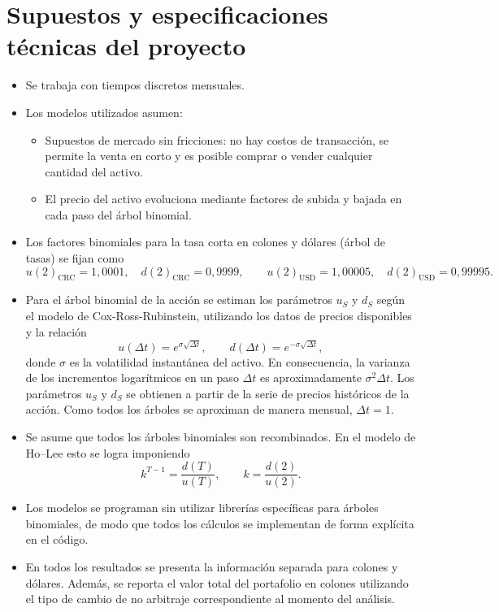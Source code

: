 \documentclass[12pt, a4paper]{article}
\begin{document}
\section{Supuestos y especificaciones técnicas del proyecto}

\begin{itemize}
    \item Se trabaja con tiempos discretos mensuales.
    \item Los modelos utilizados asumen:
    \begin{itemize}
      \item Supuestos de mercado sin fricciones: no hay costos de transacción, se permite la venta en corto y es posible comprar o vender cualquier cantidad del activo.
      \item El precio del activo evoluciona mediante factores de subida y bajada en cada paso del árbol binomial.
    \end{itemize}
  \item Los factores binomiales para la tasa corta en colones y dólares (árbol de tasas) se fijan como
  \[
    u{(2)}_{\text{CRC}} = 1{,}0001,
    \quad
    d{(2)}_{\text{CRC}} = 0{,}9999,
    \qquad
    u{(2)}_{\text{USD}} = 1{,}00005,
    \quad
    d{(2)}_{\text{USD}} = 0{,}99995.
  \]

  \item Para el árbol binomial de la acción se estiman los parámetros \(u_S\) y \(d_S\) según el modelo de Cox-Ross-Rubinstein, utilizando los datos de precios disponibles y la relación
  \begin{equation}
    u(\Delta t) = e^{\sigma\sqrt{\Delta t}},
    \qquad
    d(\Delta t) = e^{-\sigma\sqrt{\Delta t}},
    \label{eq:u-d-CRR}
  \end{equation}
  donde \(\sigma\) es la volatilidad instantánea del activo. En consecuencia, la varianza de los incrementos logarítmicos en un paso \(\Delta t\) es aproximadamente \(\sigma^2 \Delta t\). Los parámetros \(u_S\) y \(d_S\) se obtienen a partir de la serie de precios históricos de la acción. Como todos los árboles se aproximan de manera mensual, $\Delta t = 1$.

  \item Se asume que todos los árboles binomiales son recombinados. En el modelo de Ho--Lee esto se logra imponiendo
  \[
    k^{T-1} = \frac{d(T)}{u(T)},
    \qquad
    k = \frac{d(2)}{u(2)}.
  \]

  \item Los modelos se programan sin utilizar librerías específicas para árboles binomiales, de modo que todos los cálculos se implementan de forma explícita en el código.

  \item En todos los resultados se presenta la información separada para colones y dólares. Además, se reporta el valor total del portafolio en colones utilizando el tipo de cambio de no arbitraje correspondiente al momento del análisis.
\end{itemize}
\end{document}

